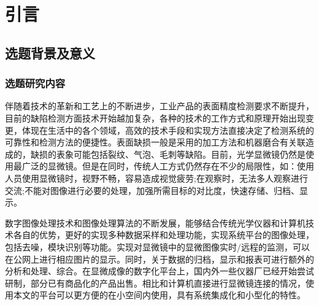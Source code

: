{\tiny {\tiny }}\chapter{引言}
\section{选题背景及意义}
\subsection{选题研究内容}
伴随着技术的革新和工艺上的不断进步，工业产品的表面精度检测要求不断提升，目前的缺陷检测方面技术开始越加复杂，各种的技术的工作方式和原理开始出现变更，体现在生活中的各个领域，高效的技术手段和实现方法直接决定了检测系统的可靠性和检测方法的便捷性。表面缺损一般是采用的加工方法和机器磨合有关联造成的，缺损的表象可能包括裂纹、气泡、毛刺等缺陷。目前，光学显微镜仍然是使用最广泛的显微镜。但是在同时，传统人工方式仍然存在不少的局限性，如：使用人员使用显微镜时，视野不畅，容易造成视觉疲劳;在观察时，无法多人观察进行交流;不能对图像进行必要的处理，加强所需目标的对比度，快速存储、归档、显示。

数字图像处理技术和图像处理算法的不断发展，能够结合传统光学仪器和计算机技术各自的优势，更好的实现多种数据采样和处理功能，实现系统平台的图像处理，包括去噪，模块识别等功能。实现对显微镜中的显微图像实时/远程的监测，可以在公网上进行相应图片的显示。同时，关于数据的归档，显示和报表可进行额外的分析和处理、综合。在显微成像的数字化平台上，国内外一些仪器厂已经开始尝试研制，部分已有商品化的产品出售。相比和计算机直接进行显微镜连接的情况，使用本文的平台可以更方便的在小空间内使用，具有系统集成化和小型化的特性。\cite{machine}\cite{light3D}\cite{eletnature}


